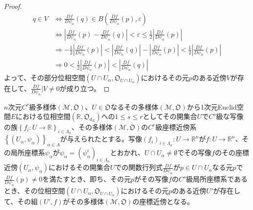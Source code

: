 \documentclass[dvipdfmx]{jsarticle}
\begin{document}
\begin{proof}
\begin{align*}
q\in V &\Leftrightarrow \frac{Df}{D\psi_\alpha }(q) \in B\left(\frac{Df}{D\psi_\alpha }(p) ,\varepsilon \right) \\
&\Leftrightarrow \left| \frac{Df}{D\psi_\alpha }(p) - \frac{Df}{D\psi_\alpha }(q) \right| < \varepsilon\leq \frac{1}{2} \left| \frac{Df}{D\psi_\alpha }(p) \right| \\
&\Rightarrow -\frac{1}{2} \left| \frac{Df}{D\psi_\alpha }(p) \right| < \left| \frac{Df}{D\psi_\alpha }(q) \right| - \left| \frac{Df}{D\psi_\alpha }(p) \right| < \frac{1}{2} \left| \frac{Df}{D\psi_\alpha }(p) \right| \\
&\Rightarrow 0 < \frac{1}{2} \left| \frac{Df}{D\psi_\alpha }(p) \right| < \left| \frac{Df}{D\psi_\alpha }(q) \right|
\end{align*}
よって、その部分位相空間$\left( U\cap U_\alpha ,\mathfrak{O}_{U\cap U_\alpha } \right)$におけるその元$p$のある近傍$V$が存在して、$\frac{Df}{D\psi_\alpha } |V \ne 0$が成り立つ。
\end{proof}
\begin{thm}\label{8.3.2.8}
$n$次元$C^{r}$級多様体$\left( \mathcal{M},\mathfrak{O} \right)$、$U \in \mathfrak{O}$なるその多様体$\left( \mathcal{M},\mathfrak{O} \right)$から1次元Euclid空間$E$における位相空間$\left( \mathbb{R},\mathfrak{O}_{d_{E}} \right)$への$1\leq s \leq r$としてその開集合$U$で$C^{s}$級な写像の族$\left\{ f_i :U \rightarrow \mathbb{R} \right\}_{i\in \varLambda_n } $、その多様体$\left( \mathcal{M},\mathfrak{O} \right)$の$C^{r}$級座標近傍系$\left\{ \left( U_{\alpha},\psi_{\alpha} \right) \right\}_{\alpha \in A}$が与えられたとする。写像$\left( f_i \right)_{i\in \varLambda_n } :U \rightarrow \mathbb{R}^n $が$f:U \rightarrow \mathbb{R}^n $、その局所座標系$\psi_\alpha $が$\psi_\alpha =\left( \psi_\alpha^i \right)_{i\in \varLambda_n }$とおかれ、$U\cap U_\alpha \ne \emptyset $でその写像$f$のその座標近傍$\left(U_\alpha ,\psi_\alpha \right)$におけるその開集合$U$での関数行列式$\frac{Df}{D\psi_\alpha }$が$p\in U\cap U_\alpha $なる元$p$で$\frac{Df}{D\psi_\alpha } (p) \ne 0$を満たすとき、即ち、その元$p$がその写像$f$の$C^s$級局所座標系であるとき、その位相空間$\left( U\cap U_\alpha ,\mathfrak{O}_{U\cap U_\alpha } \right)$におけるその元$p$のある近傍$U'$が存在して、その組$\left(U',f\right)$がその多様体$\left(\mathcal{M},\mathfrak{O}\right)$の座標近傍となる。
\end{thm}
\end{document}
